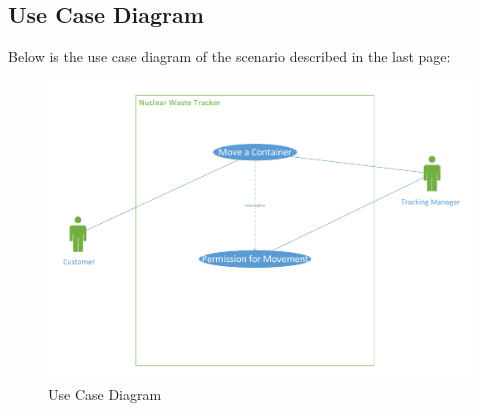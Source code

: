 \documentclass[fontsize=12pt,paper=letter,twoside]{scrartcl}
\begin{document}
\newpage
\subsection{Use Case Diagram}

Below is the use case diagram of the scenario described in the last page:
\\
\begin{figure}[!htb]
\begin{center}
\includegraphics[width=.9\textwidth]{images/move_container_uc.pdf}
\end{center}
\caption{Use Case Diagram}
\label{fig:move_container_uc}
\end{figure}

\newpage
\end{document}
